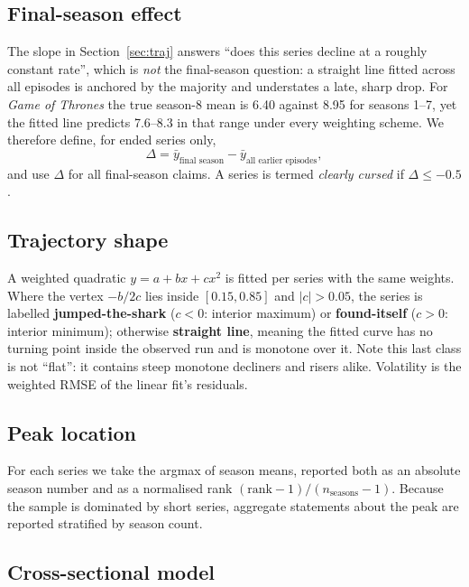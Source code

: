 \documentclass[11pt,a4paper]{article}
\begin{document}
\subsection{Final-season effect}
\label{sec:delta}

The slope in Section~\ref{sec:traj} answers ``does this series decline at a
roughly constant rate'', which is \emph{not} the final-season question: a
straight line fitted across all episodes is anchored by the majority and
understates a late, sharp drop. For \emph{Game of Thrones} the true season-8
mean is 6.40 against 8.95 for seasons 1--7, yet the fitted line predicts
7.6--8.3 in that range under every weighting scheme. We therefore define, for
ended series only,
\[
  \Delta = \bar{y}_{\text{final season}} - \bar{y}_{\text{all earlier episodes}},
\]
and use $\Delta$ for all final-season claims. A series is termed \emph{clearly
cursed} if $\Delta \le -0.5$.

\FloatBarrier
\subsection{Trajectory shape}
\label{sec:shape}

A weighted quadratic $y = a + bx + cx^2$ is fitted per series with the same
weights. Where the vertex $-b/2c$ lies inside $[0.15, 0.85]$ and $|c| > 0.05$,
the series is labelled \textbf{jumped-the-shark} ($c<0$: interior maximum) or
\textbf{found-itself} ($c>0$: interior minimum); otherwise \textbf{straight
line}, meaning the fitted curve has no turning point inside the observed run
and is monotone over it. Note this last class is not ``flat'': it contains
steep monotone decliners and risers alike. Volatility is the weighted RMSE of
the linear fit's residuals.

\FloatBarrier
\subsection{Peak location}

For each series we take the argmax of season means, reported both as an
absolute season number and as a normalised rank
$(\mathrm{rank}-1)/(n_{\text{seasons}}-1)$. Because the sample is dominated by
short series, aggregate statements about the peak are reported stratified by
season count.

\FloatBarrier
\subsection{Cross-sectional model}
\label{sec:model}
\end{document}
